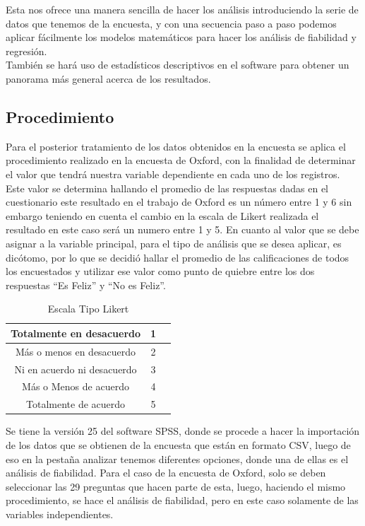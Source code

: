\documentclass[conference]{IEEEtran}
\begin{document}
   Esta nos ofrece una manera sencilla de hacer los análisis introduciendo la serie de datos que tenemos de la encuesta, y con una secuencia paso a paso podemos aplicar fácilmente los modelos matemáticos para hacer los análisis de fiabilidad y regresión. \\  

   También se hará uso de estadísticos descriptivos en el software para obtener un panorama más general acerca de los resultados.\\

\subsection{Procedimiento}
   Para el posterior tratamiento de los datos obtenidos en la encuesta se aplica el procedimiento realizado en la encuesta de Oxford, con la finalidad de determinar el valor que tendrá nuestra variable dependiente en cada uno de los registros. Este valor se determina hallando el promedio de las respuestas dadas en el cuestionario este resultado en el trabajo de Oxford es un número entre 1 y 6 sin embargo teniendo en cuenta el cambio en la escala de Likert realizada el resultado en este caso será un numero entre 1 y 5. En cuanto al valor que se debe asignar a la variable principal, para el tipo de análisis que se desea aplicar, es dicótomo, por lo que se decidió hallar el promedio de las calificaciones de todos los encuestados y utilizar ese valor como punto de quiebre entre los dos respuestas “Es Feliz” y “No es Feliz”.\\
   \begin{table}[h]
\caption{Escala Tipo Likert }
\label{tabla 1}
\begin{center}
\begin{tabular}{|c||c||c|}
\hline
 Totalmente en desacuerdo & 1\\ \hline
 Más o menos en desacuerdo & 2\\ \hline
 Ni en acuerdo ni desacuerdo & 3\\ \hline
 Más o Menos de acuerdo & 4\\ \hline
 Totalmente de acuerdo & 5\\ \hline
\end{tabular}
\end{center}
\end{table}
   Se tiene la versión 25 del software SPSS, donde se procede a hacer la importación de los datos que se obtienen de la encuesta que están en formato CSV, luego de eso en la pestaña analizar tenemos diferentes opciones, donde una de ellas es el análisis de fiabilidad. Para el caso de la encuesta de Oxford, solo se deben seleccionar las 29 preguntas que hacen parte de esta, luego, haciendo el mismo procedimiento, se hace el análisis de fiabilidad, pero en este caso solamente de las variables independientes.\\
\end{document}
